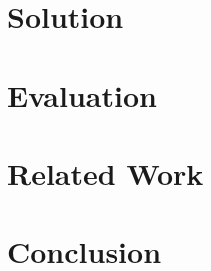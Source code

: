 \documentclass[pageno]{jpaper}
\begin{document}
\section{Solution}
\label{sec:sol}

\section{Evaluation}
\label{sec:eval}

\section{Related Work}
\label{sec:rw}

\section{Conclusion}
\label{sec:conc}



\end{document}
